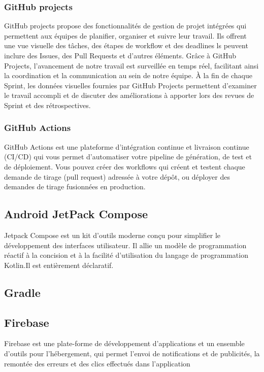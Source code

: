 \subsubsection{GitHub projects}
GitHub projects propose des fonctionnalités de gestion de projet intégrées qui permettent aux équipes de planifier, organiser et suivre leur travail. Ils offrent une vue visuelle des tâches, des étapes de workflow et des deadlines ls peuvent inclure des Issues, des Pull Requests et d'autres éléments.
Grâce à GitHub Projects, l'avancement de notre travail est surveillée  en temps réel, facilitant ainsi la coordination et la communication au sein de notre équipe. À la fin de chaque Sprint, les données visuelles fournies par GitHub Projects permettent d'examiner le travail accompli et de discuter des améliorations à apporter lors des revues de Sprint et des rétrospectives.
\subsubsection{GitHub Actions}
GitHub Actions est une plateforme d'intégration continue et livraison continue (CI/CD) qui vous permet d'automatiser votre pipeline de génération, de test et de déploiement. Vous pouvez créer des workflows qui créent et testent chaque demande de tirage (pull request) adressée à votre dépôt, ou déployer des demandes de tirage fusionnées en production.
\cite{ComprendreGitHub}

\subsection{Android JetPack Compose}
Jetpack Compose est un kit d'outils moderne conçu pour simplifier le développement des interfaces utilisateur. Il allie un modèle de programmation réactif à la concision et à la facilité d'utilisation du langage de programmation Kotlin.Il est entièrement déclaratif.

\subsection{Gradle}
\subsection{Firebase}
Firebase est une plate-forme de développement d'applications et un ensemble d'outils pour l'hébergement, qui permet l'envoi de notifications et de publicités, la remontée des erreurs et des clics effectués dans l'application

